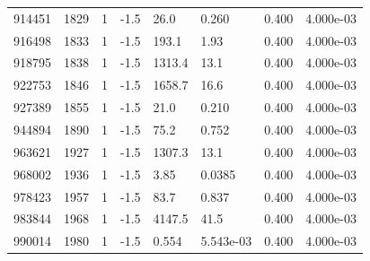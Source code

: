 \documentclass[preview]{standalone}
\begin{document}
{{{{{{{{{{{\begin{tabular}{L{1.2cm}C{1.2cm} C{0.3cm}C{0.5cm} C{1.4cm}C{1.4cm} C{1.4cm}C{1.4cm}}
  914451  &  1829  & 1     & -1.5 &  26.0  & 0.260  & 0.400 &  4.000e-03   \\ 
  916498  &  1833  & 1     & -1.5 &  193.1  & 1.93  & 0.400 &  4.000e-03   \\ 
  918795  &  1838  & 1     & -1.5 &  1313.4  & 13.1  & 0.400 &  4.000e-03   \\ 
  922753  &  1846  & 1     & -1.5 &  1658.7  & 16.6  & 0.400 &  4.000e-03   \\ 
  927389  &  1855  & 1     & -1.5 &  21.0  & 0.210  & 0.400 &  4.000e-03   \\ 
  944894  &  1890  & 1     & -1.5 &  75.2  & 0.752  & 0.400 &  4.000e-03   \\ 
  963621  &  1927  & 1     & -1.5 &  1307.3  & 13.1  & 0.400 &  4.000e-03   \\ 
  968002  &  1936  & 1     & -1.5 &  3.85  & 0.0385  & 0.400 &  4.000e-03   \\ 
  978423  &  1957  & 1     & -1.5 &  83.7  & 0.837  & 0.400 &  4.000e-03   \\ 
  983844  &  1968  & 1     & -1.5 &  4147.5  & 41.5  & 0.400 &  4.000e-03   \\ 
  990014  &  1980  & 1     & -1.5 &  0.554  & 5.543e-03  & 0.400 &  4.000e-03   \\ 
\hline 
\end{tabular} 

}}}}}}}}}}}
\end{document}
